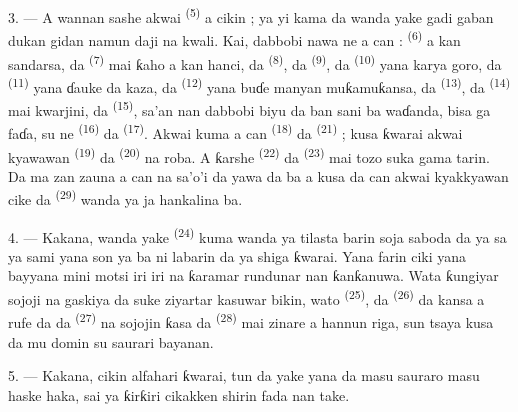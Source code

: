 \VUsaut{3.0mm}
\VUsaut{2.6mm}

3. --- A wannan sashe akwai  \textsuperscript{(5)} a cikin
 ; ya yi kama da wanda yake gadi gaban dukan gidan
namun daji na kwali. Kai, dabbobi nawa ne a can : 
\textsuperscript{(6)} a kan sandarsa, da  \textsuperscript{(7)} mai
ƙaho a kan hanci, da  \textsuperscript{(8)}, da
 \textsuperscript{(9)}, da  \textsuperscript{(10)} yana
karya goro, da  \textsuperscript{(11)} yana ɗauke da kaza, da
 \textsuperscript{(12)} yana buɗe manyan muƙamuƙansa, da
 \textsuperscript{(13)}, da  \textsuperscript{(14)} mai kwarjini, da 
\textsuperscript{(15)}, sa’an nan dabbobi biyu da ban sani ba waɗanda, bisa
ga faɗa, su ne  \textsuperscript{(16)} da
 \textsuperscript{(17)}. Akwai kuma a can 
\textsuperscript{(18)} da  \textsuperscript{(21)} ; kusa ƙwarai akwai
kyawawan  \textsuperscript{(19)} da 
\textsuperscript{(20)} na roba. A ƙarshe 
\textsuperscript{(22)} da  \textsuperscript{(23)} mai tozo suka gama
tarin. Da ma zan zauna a can na sa’o’i da yawa da ba a kusa da can
akwai kyakkyawan  cike da 
\textsuperscript{(29)} wanda ya ja hankalina ba.

\VUsaut{4.0mm}
\VUsaut{2.8mm}

4. --- Kakana, wanda yake  \textsuperscript{(24)} kuma wanda
ya tilasta barin soja saboda  da ya sa ya sami
 yana son ya ba ni labarin 
da ya shiga ƙwarai. Yana farin ciki yana bayyana mini motsi iri iri na
ƙaramar rundunar nan ƙanƙanuwa. Wata ƙungiyar sojoji na gaskiya da suke
ziyartar kasuwar bikin, wato  \textsuperscript{(25)}, da
 \textsuperscript{(26)} da kansa a rufe da
 da  \textsuperscript{(27)} na sojojin
ƙasa da  \textsuperscript{(28)} mai  zinare a
hannun riga, sun tsaya kusa da mu domin su saurari bayanan.

5. --- Kakana, cikin alfahari ƙwarai, tun da yake yana da masu
sauraro masu haske haka, sai ya ƙirƙiri cikakken shirin fada nan take.

